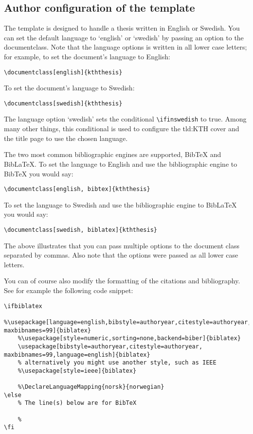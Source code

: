 \subsection{Author configuration of the template}
\label{sec:authorConfigs}
The template is designed to handle a thesis written in English or Swedish.
You can set the default language to `english' or `swedish' by passing an option to the documentclass. Note that the language options is written in all lower case letters; for example, to set the document's language to English:
\begin{lstlisting}
\documentclass[english]{kththesis}
\end{lstlisting}

To set the document's language to Swedish:
\begin{lstlisting}
\documentclass[swedish]{kththesis}
\end{lstlisting}

The language option `swedish' sets the conditional \texttt{\textbackslash ifinswedish} to true.  Among many other things, this conditional is used to configure the \gls{tld:KTH} cover and the title page to use the chosen language.

The two most common bibliographic engines are supported, \ie BibTeX and BibLaTeX. To set the language to English and use the bibliographic engine to BibTeX you would say:
\begin{lstlisting}
\documentclass[english, bibtex]{kththesis}
\end{lstlisting}
To set the language to Swedish and use the bibliographic engine to BibLaTeX you would say:
\begin{lstlisting}
\documentclass[swedish, biblatex]{kththesis}
\end{lstlisting}

The above illustrates that you can pass multiple options to the document class separated by commas. Also note that the options were passed as all lower case letters.

You can of course also modify the formatting of the citations and bibliography. See for example the following code snippet:
\small{
\begin{lstlisting}
\ifbiblatex
    %\usepackage[language=english,bibstyle=authoryear,citestyle=authoryear, maxbibnames=99]{biblatex}
    %\usepackage[style=numeric,sorting=none,backend=biber]{biblatex}
    \usepackage[bibstyle=authoryear,citestyle=authoryear, maxbibnames=99,language=english]{biblatex}
    % alternatively you might use another style, such as IEEE
    %\usepackage[style=ieee]{biblatex}
    
    %\DeclareLanguageMapping{norsk}{norwegian}
\else
    % The line(s) below are for BibTeX
    
    %
\fi
\end{lstlisting}
}

